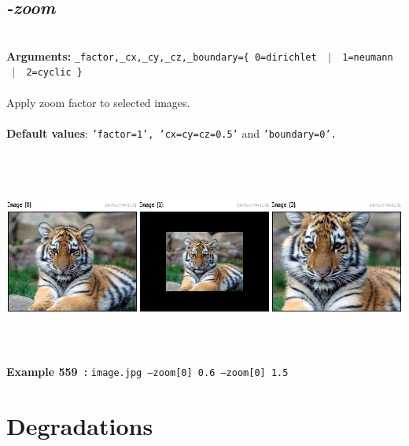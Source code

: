 \documentclass[a4paper,11pt,twoside]{book}
\begin{document}
\subsection{\emph{-zoom} }\vspace*{-0.5em}
~\\\textbf{Arguments: } 
{\small \texttt{\_factor,\_cx,\_cy,\_cz,\_boundary=\{ 0=dirichlet ~$|$~ 1=neumann ~$|$~ 2=cyclic \}}}\\~\\
Apply zoom factor to selected images.
~\\~\\\textbf{Default values}: {\small \texttt{'factor=1', 'cx=cy=cz=0.5'} and \texttt{'boundary=0'.}}
\begin{center}\includegraphics[keepaspectratio=true,height=7cm,width=\textwidth]{img/gmic_def559.jpg}\\
{\footnotesize \textbf{Example 559~:} \texttt{image.jpg --zoom[0] 0.6 --zoom[0] 1.5}}
\end{center}
\section{Degradations}
\end{document}
